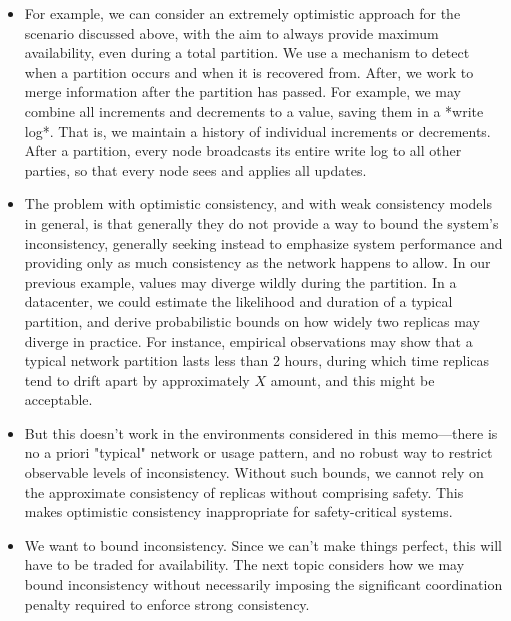 \begin{itemize}
  \item For example, we can consider an extremely optimistic approach for
  the scenario discussed above, with the aim to always provide maximum
  availability, even during a total partition. We use a mechanism to
  detect when a partition occurs and when it is recovered from. After,
  we work to merge information after the partition has passed. For
  example, we may combine all increments and decrements to a value,
  saving them in a *write log*. That is, we maintain a history of
  individual increments or decrements. After a partition, every node
  broadcasts its entire write log to all other parties, so that every
  node sees and applies all updates.

  \item The problem with optimistic consistency, and with weak consistency
  models in general, is that generally they do not provide a way to
  bound the system's inconsistency, generally seeking instead to
  emphasize system performance and providing only as much consistency
  as the network happens to allow. In our previous example, values may
  diverge wildly during the partition. In a datacenter, we could
  estimate the likelihood and duration of a typical partition, and
  derive probabilistic bounds on how widely two replicas may diverge
  in practice. For instance, empirical observations may show that a
  typical network partition lasts less than 2 hours, during which time
  replicas tend to drift apart by approximately $X$ amount, and this
  might be acceptable.

  \item But this doesn't work in the environments considered in this
  memo---there is no a priori "typical" network or usage pattern, and
  no robust way to restrict observable levels of
  inconsistency. Without such bounds, we cannot rely on the
  approximate consistency of replicas without comprising safety. This
  makes optimistic consistency inappropriate for safety-critical
  systems.

  \item We want to bound inconsistency. Since we can't make things perfect,
  this will have to be traded for availability. The next topic
  considers how we may bound inconsistency without necessarily
  imposing the significant coordination penalty required to enforce
  strong consistency.
  
\end{itemize}

